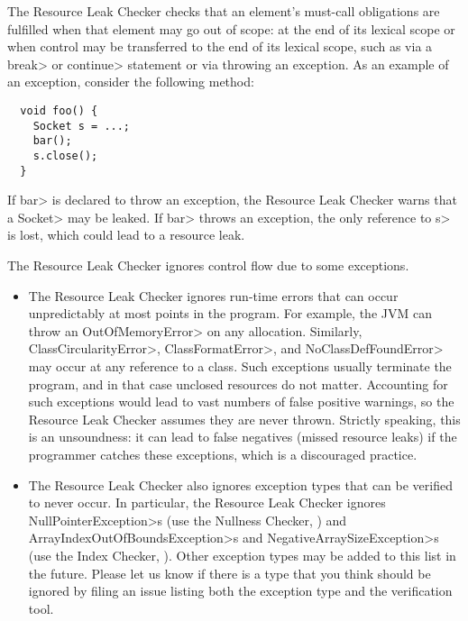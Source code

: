


The Resource Leak Checker checks that an element's must-call obligations
are fulfilled when that element may go out of scope: at the end of its
lexical scope or when control may be transferred to the end of its lexical
scope, such as via a \<break> or \<continue> statement or via throwing an
exception.  As an example of an exception, consider the following method:

\begin{verbatim}
  void foo() {
    Socket s = ...;
    bar();
    s.close();
  }
\end{verbatim}

If \<bar> is declared to throw an exception, the Resource Leak Checker
warns that a \<Socket> may be leaked.  If \<bar> throws an exception, the
only reference to \<s> is lost, which could lead to a resource leak.

The Resource Leak Checker ignores control flow due to some exceptions.

\begin{itemize}
\item
The Resource Leak Checker ignores run-time errors that can occur
unpredictably at most points in the program. For example, the JVM can throw
an \<OutOfMemoryError> on any allocation.  Similarly,
\<ClassCircularityError>, \<ClassFormatError>, and \<NoClassDefFoundError>
may occur at any reference to a class.  Such exceptions usually terminate
the program, and in that case unclosed resources do not matter.
Accounting for such exceptions would lead to vast numbers of
false positive warnings, so the Resource Leak Checker assumes they are
never thrown.  Strictly speaking, this is an unsoundness:  it can lead to
false negatives (missed resource leaks) if the programmer catches these
exceptions, which is a discouraged practice.

\item
The Resource Leak Checker also ignores exception types that can be verified
to never occur.  In particular, the Resource Leak Checker ignores \<NullPointerException>s
(use the Nullness Checker, ) and
\<ArrayIndexOutOfBoundsException>s and \<NegativeArraySizeException>s (use the Index
Checker, ). Other exception types may be added to this
list in the future.  Please let us know if there is a type that you think should
be ignored by filing an issue listing both the exception type and the
verification tool.
\end{itemize}


